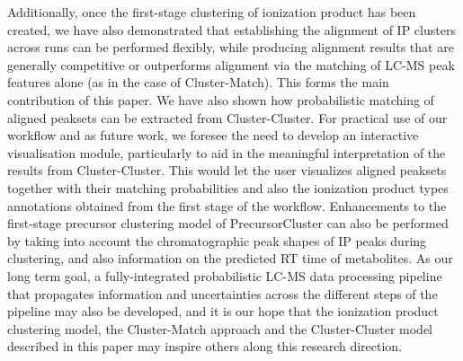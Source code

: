 Additionally, once the first-stage clustering of ionization product has been created, we have also demonstrated that establishing the alignment of IP clusters across runs can be performed flexibly, while producing alignment results that are generally competitive or outperforms alignment via the matching of LC-MS peak features alone (as in the case of Cluster-Match). This forms the main contribution of this paper. We have also shown how probabilistic matching of aligned peaksets can be extracted from Cluster-Cluster. For practical use of our workflow and as future work, we foresee the need to develop an interactive visualisation module, particularly to aid in the meaningful interpretation of the results from Cluster-Cluster. This would let the user visualizes aligned peaksets together with their matching probabilities and also the ionization product types annotations obtained from the first stage of the workflow. Enhancements to the first-stage precursor clustering model of PrecursorCluster can also be performed by taking into account the chromatographic peak shapes of IP peaks during clustering, and also information on the predicted RT time of metabolites. As our long term goal, a fully-integrated probabilistic LC-MS data processing pipeline that propagates information and uncertainties across the different steps of the pipeline may also be developed, and it is our hope that the ionization product clustering model, the Cluster-Match approach and the Cluster-Cluster model described in this paper may inspire others along this research direction.